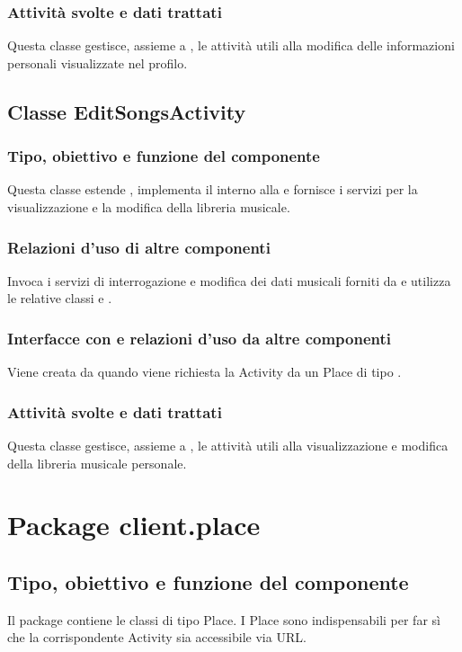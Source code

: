 \subsubsection*{Attivit\`a svolte e dati trattati}
Questa classe gestisce, assieme a , le attivit\`a utili alla
modifica delle informazioni personali visualizzate nel profilo.

\subsection{Classe EditSongsActivity}
\subsubsection*{Tipo, obiettivo e funzione del componente}
Questa classe estende , implementa il 
interno alla  e fornisce i servizi per la visualizzazione e la
modifica della libreria musicale.
\subsubsection*{Relazioni d'uso di altre componenti} Invoca i servizi di
interrogazione e modifica dei dati musicali forniti da  e
utilizza le relative classi  e .
\subsubsection*{Interfacce con e relazioni d'uso da altre componenti}
Viene creata da  quando viene richiesta la Activity da
un Place di tipo .
\subsubsection*{Attivit\`a svolte e dati trattati}
Questa classe gestisce, assieme a , le attivit\`a utili alla
visualizzazione e modifica della libreria musicale personale.

\newpage
\section{Package client.place} %
\subsection*{Tipo, obiettivo e funzione del componente}
Il package contiene le classi di tipo Place. I Place sono indispensabili
per far s\`i che la corrispondente Activity sia accessibile via URL.
